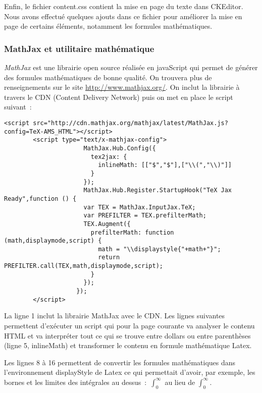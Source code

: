 Enfin, le fichier content.css contient la mise en page du texte dans CKEditor. Nous avons effectué quelques ajouts dans ce fichier pour améliorer la mise en page de certains éléments, notamment les formules mathématiques. 
     
\subsubsection{MathJax et utilitaire mathématique}

\emph{MathJax} est une librairie open source réalisée en javaScript qui permet de générer des formules mathématiques de bonne qualité. On trouvera plus de renseignements sur le site \url{http://www.mathjax.org/}. On inclut la librairie à travers le CDN (Content Delivery Network) puis on met en place le script suivant~:

\begin{lstlisting} 
<script src="http://cdn.mathjax.org/mathjax/latest/MathJax.js?config=TeX-AMS_HTML"></script>
        <script type="text/x-mathjax-config">
                      MathJax.Hub.Config({
                        tex2jax: {
                          inlineMath: [["$","$"],["\\(","\\)"]]
                        }
                      });
                      MathJax.Hub.Register.StartupHook("TeX Jax Ready",function () {
                      var TEX = MathJax.InputJax.TeX;
                      var PREFILTER = TEX.prefilterMath;
                      TEX.Augment({
                        prefilterMath: function (math,displaymode,script) {
                          math = "\\displaystyle{"+math+"}";
                          return PREFILTER.call(TEX,math,displaymode,script);
                        }
                      });
                    });
		</script>
\end{lstlisting}

La ligne 1 inclut la librairie MathJax avec le CDN. Les lignes suivantes permettent d'exécuter un script qui pour la page courante va analyser le contenu HTML et va interpréter tout ce qui se trouve entre dollars ou entre parenthèses (ligne 5, inlineMath) et transformer le contenu en formule mathématique Latex. 

Les lignes 8 à 16 permettent de convertir les formules mathématiques dans l'environnement displayStyle de Latex ce qui permettait d'avoir, par exemple, les bornes et les limites des intégrales au dessus~:~$\displaystyle{\int _0^\infty}$ au lieu de $\int_0^\infty$. \\

